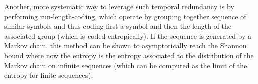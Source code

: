 
Another, more systematic way to leverage such temporal redundancy is by performing run-length-coding, which operate by grouping together sequence of similar symbols and thus coding first a symbol and then the length of the associated group (which is coded entropically). If the sequence is generated by a Markov chain, this method can be shown to asymptotically reach the Shannon bound where now the entropy is the entropy associated to the distribution of the Markov chain on infinite sequences (which can be computed as the limit of the entropy for finite sequences).



